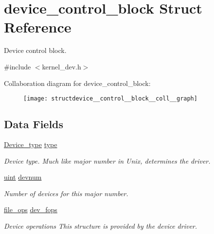 \hypertarget{structdevice__control__block}{}\section{device\+\_\+control\+\_\+block Struct Reference}
\label{structdevice__control__block}


Device control block.  




{\ttfamily \#include $<$kernel\+\_\+dev.\+h$>$}



Collaboration diagram for device\+\_\+control\+\_\+block\+:\nopagebreak
\begin{figure}[H]
\begin{center}
\leavevmode
\texttt{[image: structdevice\_\_control\_\_block\_\_coll\_\_graph]}
\end{center}
\end{figure}
\subsection*{Data Fields}
\begin{DoxyCompactItemize}
\item 
\hyperlink{group__dev_ga879ceac20e83b2375e5b49f4379b0c90}{Device\+\_\+type} \hyperlink{structdevice__control__block_a35a45268132777177a33513c747633c4}{type}\hypertarget{structdevice__control__block_a35a45268132777177a33513c747633c4}{}\label{structdevice__control__block_a35a45268132777177a33513c747633c4}

\begin{DoxyCompactList}\small\item\em Device type. Much like \textquotesingle{}major number\textquotesingle{} in Unix, determines the driver. \end{DoxyCompactList}\item 
\hyperlink{bios_8h_a91ad9478d81a7aaf2593e8d9c3d06a14}{uint} \hyperlink{structdevice__control__block_a25d8f038a1c6d41f445d078276117fba}{devnum}\hypertarget{structdevice__control__block_a25d8f038a1c6d41f445d078276117fba}{}\label{structdevice__control__block_a25d8f038a1c6d41f445d078276117fba}

\begin{DoxyCompactList}\small\item\em Number of devices for this major number. \end{DoxyCompactList}\item 
\hyperlink{group__dev_gaab625d8ae3a95e942ed10ed1579f5042}{file\+\_\+ops} \hyperlink{structdevice__control__block_a2945d5da96f40ff7fae94e295624a7c7}{dev\+\_\+fops}\hypertarget{structdevice__control__block_a2945d5da96f40ff7fae94e295624a7c7}{}\label{structdevice__control__block_a2945d5da96f40ff7fae94e295624a7c7}

\begin{DoxyCompactList}\small\item\em Device operations This structure is provided by the device driver. \end{DoxyCompactList}\end{DoxyCompactItemize}


